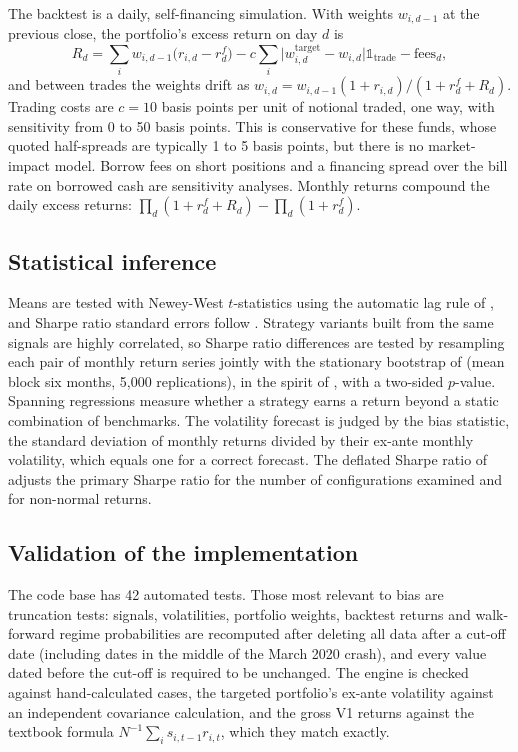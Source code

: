 \documentclass[11pt,a4paper]{article}
\begin{document}
The backtest is a daily, self-financing simulation. With weights $w_{i,d-1}$ at the previous close, the portfolio's excess return on day $d$ is
\begin{equation}
R_d = \sum_i w_{i,d-1}\bigl(r_{i,d} - r^f_d\bigr) - c \sum_i \bigl| w^{\text{target}}_{i,d} - w_{i,d} \bigr| \mathbb{1}_{\text{trade}} - \text{fees}_d,
\end{equation}
and between trades the weights drift as $w_{i,d} = w_{i,d-1}(1 + r_{i,d})/(1 + r^f_d + R_d)$. Trading costs are $c = 10$ basis points per unit of notional traded, one way, with sensitivity from 0 to 50 basis points. This is conservative for these funds, whose quoted half-spreads are typically 1 to 5 basis points, but there is no market-impact model. Borrow fees on short positions and a financing spread over the bill rate on borrowed cash are sensitivity analyses. Monthly returns compound the daily excess returns: $\prod_d (1 + r^f_d + R_d) - \prod_d (1 + r^f_d)$.

\subsection{Statistical inference}

Means are tested with Newey-West $t$-statistics using the automatic lag rule of \citet{newey1994}, and Sharpe ratio standard errors follow \citet{lo2002}. Strategy variants built from the same signals are highly correlated, so Sharpe ratio differences are tested by resampling each pair of monthly return series jointly with the stationary bootstrap of \citet{politis1994} (mean block six months, 5,000 replications), in the spirit of \citet{ledoit2008}, with a two-sided $p$-value. Spanning regressions measure whether a strategy earns a return beyond a static combination of benchmarks. The volatility forecast is judged by the bias statistic, the standard deviation of monthly returns divided by their ex-ante monthly volatility, which equals one for a correct forecast. The deflated Sharpe ratio of \citet{bailey2014} adjusts the primary Sharpe ratio for the number of configurations examined and for non-normal returns.

\subsection{Validation of the implementation}

The code base has 42 automated tests. Those most relevant to bias are truncation tests: signals, volatilities, portfolio weights, backtest returns and walk-forward regime probabilities are recomputed after deleting all data after a cut-off date (including dates in the middle of the March 2020 crash), and every value dated before the cut-off is required to be unchanged. The engine is checked against hand-calculated cases, the targeted portfolio's ex-ante volatility against an independent covariance calculation, and the gross V1 returns against the textbook formula $N^{-1}\sum_i s_{i,t-1} r_{i,t}$, which they match exactly.
\end{document}
